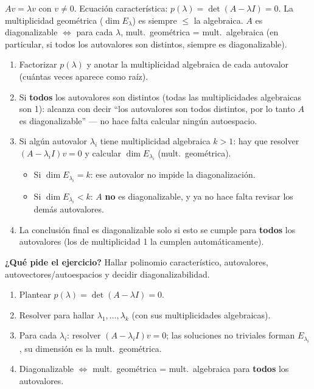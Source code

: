 \documentclass[11pt,a4paper]{article}
\newcommand{\qpide}[1]{\textbf{¿Qué pide el ejercicio?} #1\par}
\begin{document}
\begin{teoria}
$Av=\lambda v$ con $v\neq0$. Ecuación característica: $p(\lambda)=\det(A-\lambda I)=0$. La
multiplicidad geométrica ($\dim E_\lambda$) es siempre $\le$ la algebraica. $A$ es
diagonalizable $\Leftrightarrow$ para cada $\lambda$, mult.\ geométrica = mult.\ algebraica
(en particular, si todos los autovalores son distintos, siempre es diagonalizable).
\end{teoria}

\begin{proc}
\begin{enumerate}
    \item Factorizar $p(\lambda)$ y anotar la multiplicidad algebraica de cada autovalor
    (cuántas veces aparece como raíz).
    \item Si \textbf{todos} los autovalores son distintos (todas las multiplicidades
    algebraicas son 1): alcanza con decir ``los autovalores son todos distintos, por lo
    tanto $A$ es diagonalizable'' — no hace falta calcular ningún autoespacio.
    \item Si algún autovalor $\lambda_i$ tiene multiplicidad algebraica $k>1$: hay que
    resolver $(A-\lambda_iI)v=0$ y calcular $\dim E_{\lambda_i}$ (mult.\ geométrica).
    \begin{itemize}
        \item Si $\dim E_{\lambda_i}=k$: ese autovalor no impide la diagonalización.
        \item Si $\dim E_{\lambda_i}<k$: $A$ \textbf{no} es diagonalizable, y ya no hace
        falta revisar los demás autovalores.
    \end{itemize}
    \item La conclusión final es diagonalizable solo si esto se cumple para
    \textbf{todos} los autovalores (los de multiplicidad 1 la cumplen automáticamente).
\end{enumerate}
\end{proc}

\qpide{Hallar polinomio característico, autovalores, autovectores/autoespacios y decidir
diagonalizabilidad.}

\begin{proc}
\begin{enumerate}
    \item Plantear $p(\lambda)=\det(A-\lambda I)=0$.
    \item Resolver para hallar $\lambda_1,\dots,\lambda_k$ (con sus multiplicidades
    algebraicas).
    \item Para cada $\lambda_i$: resolver $(A-\lambda_iI)v=0$; las soluciones no
    triviales forman $E_{\lambda_i}$, su dimensión es la mult.\ geométrica.
    \item Diagonalizable $\Leftrightarrow$ mult.\ geométrica = mult.\ algebraica para
    \textbf{todos} los autovalores.
\end{enumerate}
\end{proc}
\end{document}
